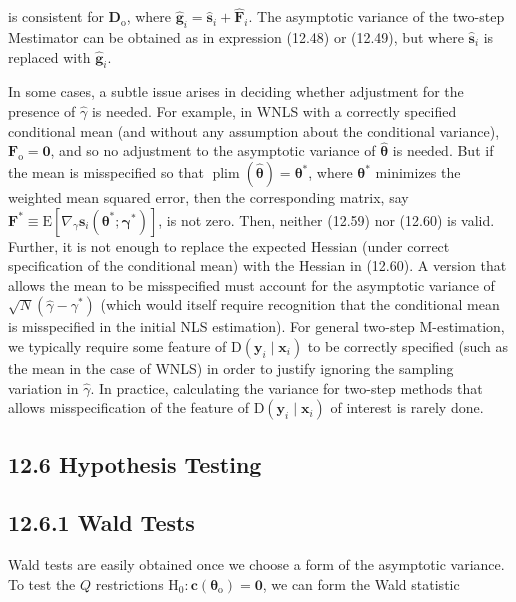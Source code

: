 \documentclass[10pt]{article}
\begin{document}
is consistent for $\mathbf{D}_{\mathrm{o}}$, where $\hat{\mathbf{g}}_{i}=\hat{\mathbf{s}}_{i}+\hat{\mathbf{F}}_{i}$. The asymptotic variance of the two-step Mestimator can be obtained as in expression (12.48) or (12.49), but where $\hat{\mathbf{s}}_{i}$ is replaced with $\hat{\mathbf{g}}_{i}$.

In some cases, a subtle issue arises in deciding whether adjustment for the presence of $\hat{\gamma}$ is needed. For example, in WNLS with a correctly specified conditional mean (and without any assumption about the conditional variance), $\mathbf{F}_{\mathrm{o}}=\mathbf{0}$, and so no adjustment to the asymptotic variance of $\hat{\boldsymbol{\theta}}$ is needed. But if the mean is misspecified so that $\operatorname{plim}(\hat{\boldsymbol{\theta}})=\boldsymbol{\theta}^{*}$, where $\boldsymbol{\theta}^{*}$ minimizes the weighted mean squared error, then the corresponding matrix, say $\mathbf{F}^{*} \equiv \mathrm{E}\left[\nabla_{\gamma} \mathbf{s}_{i}\left(\boldsymbol{\theta}^{*} ; \boldsymbol{\gamma}^{*}\right)\right]$, is not zero. Then, neither (12.59) nor (12.60) is valid. Further, it is not enough to replace the expected Hessian (under correct specification of the conditional mean) with the Hessian in (12.60). A version that allows the mean to be misspecified must account for the asymptotic variance of $\sqrt{N}\left(\hat{\gamma}-\gamma^{*}\right)$ (which would itself require recognition that the conditional mean is misspecified in the initial NLS estimation). For general two-step M-estimation, we typically require some feature of $\mathrm{D}\left(\mathbf{y}_{i} \mid \mathbf{x}_{i}\right)$ to be correctly specified (such as the mean in the case of WNLS) in order to justify ignoring the sampling variation in $\hat{\gamma}$. In practice, calculating the variance for two-step methods that allows misspecification of the feature of $\mathrm{D}\left(\mathbf{y}_{i} \mid \mathbf{x}_{i}\right)$ of interest is rarely done.

\subsection*{12.6 Hypothesis Testing}
\subsection*{12.6.1 Wald Tests}
Wald tests are easily obtained once we choose a form of the asymptotic variance. To test the $Q$ restrictions $\mathrm{H}_{0}: \mathbf{c}\left(\boldsymbol{\theta}_{\mathrm{o}}\right)=\mathbf{0}$, we can form the Wald statistic
\end{document}
